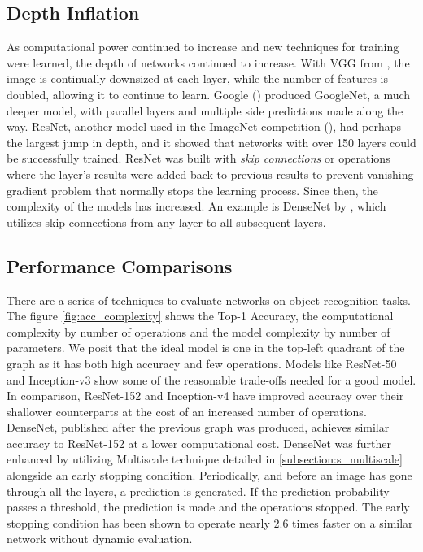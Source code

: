 \subsection{Depth Inflation}\label{subsection:o_depth}
As computational power continued to increase and new techniques for training were learned, the depth of networks continued to increase.  
With VGG from \cite{DBLP:journals/corr/SimonyanVZ13}, the image is continually downsized at each layer, while the number of features is doubled, allowing it to continue to learn.  
Google (\cite{DBLP:journals/corr/SzegedyLJSRAEVR14}) produced GoogleNet, a much deeper model, with parallel layers and multiple side predictions made along the way.  
ResNet, another model used in the ImageNet competition (\cite{DBLP:journals/corr/HeZRS15}), had perhaps the largest jump in depth, and it showed that networks with over 150 layers could be successfully trained.  
ResNet was built with \textit{skip connections} or operations where the layer's results were added back to previous results to prevent vanishing gradient problem that normally stops the learning process.  
Since then, the complexity of the models has increased. An example is DenseNet by \cite{DBLP:journals/corr/HuangLW16a}, which utilizes skip connections from any layer
to all subsequent layers.

\subsection{Performance Comparisons}\label{subsection:o_performance}
There are a series of techniques to evaluate networks on object recognition tasks.  
The figure \ref{fig:acc_complexity} shows the Top-1 Accuracy, the computational complexity by number of operations and the model complexity by number of parameters.  
We posit that the ideal model is one in the top-left quadrant of the graph as it has both high accuracy and few operations.  
Models like ResNet-50 and Inception-v3 show some of the reasonable trade-offs needed for a good model.  
In comparison, ResNet-152 and Inception-v4 have improved accuracy over their shallower counterparts at the cost of an increased number of operations.  
DenseNet, published after the previous graph was produced, achieves similar accuracy to ResNet-152 at a lower computational cost.  
DenseNet was further enhanced by utilizing Multiscale technique detailed in \ref{subsection:s_multiscale} alongside an early stopping condition.  Periodically, and before an image has gone through all the layers, a prediction is generated. If the prediction probability passes a threshold, the prediction is made and the operations stopped.  
The early stopping condition has been shown to operate nearly 2.6 times faster on a similar network without dynamic evaluation.


